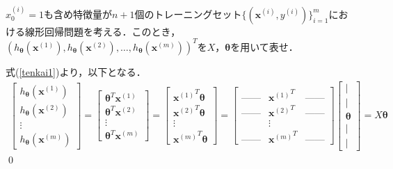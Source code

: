 \begin{qu}
$x_0^{(i)}=1$も含め特徴量が$n+1$個のトレーニングセット$\{({\bm x}^{(i)},y^{(i)})\}_{i=1}^m$における線形回帰問題を考える．このとき，$(h_{{\bm \theta}}({\bm x}^{(1)}),h_{{\bm \theta}}({\bm x}^{(2)}),\ldots,h_{{\bm \theta}}({\bm x}^{(m)}))^T$を$X$，${\bm \theta}$を用いて表せ．
\end{qu}
\begin{ans}
式(\ref{tenkai1})より，以下となる．
\begin{align}
\begin{bmatrix}
h_{{\bm \theta}}({\bm x}^{(1)}) \\
h_{{\bm \theta}}({\bm x}^{(2)}) \\
\vdots \\
h_{{\bm \theta}}({\bm x}^{(m)})
\end{bmatrix}
=
\begin{bmatrix}
{\bm \theta}^T{\bm x}^{(1)} \\
{\bm \theta}^T {\bm x}^{(2)}\\
\vdots \\
{\bm \theta}^T {\bm x}^{(m)}
\end{bmatrix}
=
\begin{bmatrix}
{{\bm x}^{(1)}}^T{\bm \theta} \\
{{\bm x}^{(2)}}^T{\bm \theta} \\
\vdots \\
{{\bm x}^{(m)}}^T{\bm \theta}
\end{bmatrix}
=
\begin{bmatrix}
\mbox{------} & {{\bm x}^{(1)}}^T & \mbox{------} \\
\mbox{------} & {{\bm x}^{(2)}}^T & \mbox{------} \\
 & \vdots & \\
\mbox{------} & {{\bm x}^{(m)}}^T & \mbox{------}
\end{bmatrix}
\begin{bmatrix}
| \\[-2pt]
| \\
{\bm \theta} \\
| \\[-2pt]
|
\end{bmatrix}
=X {\bm \theta} \label{lr_hypo}
\end{align}
\qed
\end{ans}

